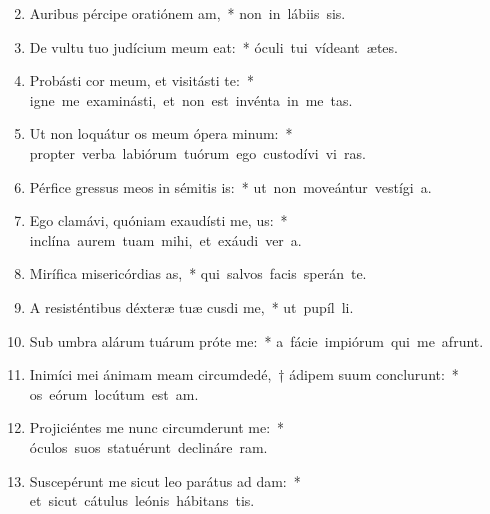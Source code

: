 \begin{flushleft}
\begin{enumerate}[leftmargin=*]
\setcounter{enumi}{1}

\item Auribus pércipe oratiónem am,~* \mbox{non in lábiis sis.}

\item De vultu tuo judícium meum eat:~* \mbox{óculi tui vídeant ætes.}

\item Probásti cor meum, et visitásti te:~* \mbox{igne me examinásti, et non est invénta in me tas.}

\item Ut non loquátur os meum ópera minum:~* \mbox{propter verba labiórum tuórum ego custodívi vi ras.}

\item Pérfice gressus meos in sémitis is:~* \mbox{ut non moveántur vestígi a.}

\item Ego clamávi, quóniam exaudísti me, us:~* \mbox{inclína aurem tuam mihi, et exáudi ver a.}

\item Mirífica misericórdias as,~* \mbox{qui salvos facis sperán  te.}

\item A resisténtibus déxteræ tuæ cusdi me,~* \mbox{ut pupíl li.}

\item Sub umbra alárum tuárum próte me:~* \mbox{a fácie impiórum qui me afrunt.}

\item Inimíci mei ánimam meam circumdedé,~† ádipem suum conclurunt:~* \mbox{os eórum locútum est am.}

\item Projiciéntes me nunc circumderunt me:~* \mbox{óculos suos statuérunt declináre  ram.}

\item Suscepérunt me sicut leo parátus ad dam:~* \mbox{et sicut cátulus leónis hábitans  tis.}


\end{enumerate}
\end{flushleft}
